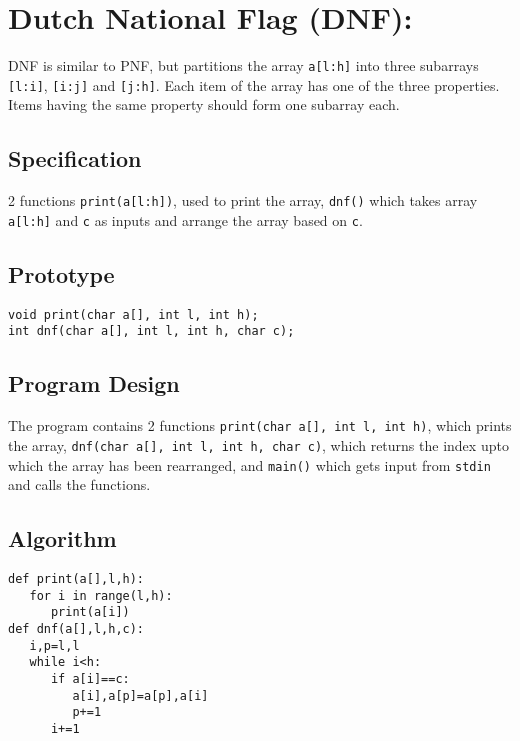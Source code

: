 \documentclass[11pt]{article}
\begin{document}
\section{Dutch National Flag (DNF):}
\label{sec-4}
DNF is similar to PNF, but partitions the
array \texttt{a[l:h]} into three subarrays \texttt{[l:i]}, \texttt{[i:j]} and
\texttt{[j:h]}. Each item of the array has one of the three
properties. Items having the same property should form one subarray
each.
\subsection*{Specification}
\label{sec-4-1}
2 functions \texttt{print(a[l:h])}, used to print the array, \texttt{dnf()}
which takes array \texttt{a[l:h]} and \texttt{c} as inputs and arrange the array
based on \texttt{c}.
\subsection*{Prototype}
\label{sec-4-2}
\begin{verbatim}
void print(char a[], int l, int h);
int dnf(char a[], int l, int h, char c);
\end{verbatim}
\subsection*{Program Design}
\label{sec-4-3}
The program contains 2 functions \texttt{print(char a[], int l, int h)},
which prints the array, \texttt{dnf(char a[], int l, int h, char c)}, which
returns the index upto which the array has been rearranged, and \texttt{main()}
which gets input from \texttt{stdin} and calls the functions.
\subsection*{Algorithm}
\label{sec-4-4}
\begin{verbatim}
def print(a[],l,h):
   for i in range(l,h):
      print(a[i])
def dnf(a[],l,h,c):
   i,p=l,l
   while i<h:
      if a[i]==c:
         a[i],a[p]=a[p],a[i]
         p+=1
      i+=1
\end{verbatim}
\end{document}
